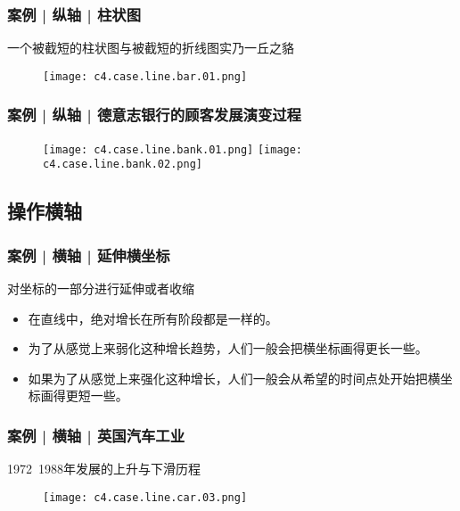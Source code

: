 \begin{frame}
  \frametitle{案例 | 纵轴 | 柱状图}
  \begin{block}{一个被截短的柱状图与被截短的折线图实乃一丘之貉}
  \begin{figure}
    \centering
    \texttt{[image: c4.case.line.bar.01.png]}
  \end{figure}
  \end{block}
\end{frame}

\begin{frame}
  \frametitle{案例 | 纵轴 | 德意志银行的顾客发展演变过程}
  \begin{figure}
    \centering
    \texttt{[image: c4.case.line.bank.01.png]}\quad
    \texttt{[image: c4.case.line.bank.02.png]}
  \end{figure}
\end{frame}

\subsection{操作横轴}
\begin{frame}
  \frametitle{案例 | 横轴 | 延伸横坐标}
  \begin{block}{对坐标的一部分进行延伸或者收缩}
    \begin{itemize}
      \item<1-> 在直线中，绝对增长在所有阶段都是一样的。
      \item<2-> 为了从感觉上来弱化这种增长趋势，人们一般会把横坐标画得更长一些。
      \item<3-> 如果为了从感觉上来强化这种增长，人们一般会从希望的时间点处开始把横坐标画得更短一些。
    \end{itemize}
    \begin{figure}
      \centering
    \end{figure}
  \end{block}
\end{frame}

\begin{frame}
  \frametitle{案例 | 横轴 | 英国汽车工业}
  \begin{block}{1972~1988年发展的上升与下滑历程}
    \begin{figure}
      \centering
      \texttt{[image: c4.case.line.car.03.png]}
    \end{figure}
  \end{block}
\end{frame}

